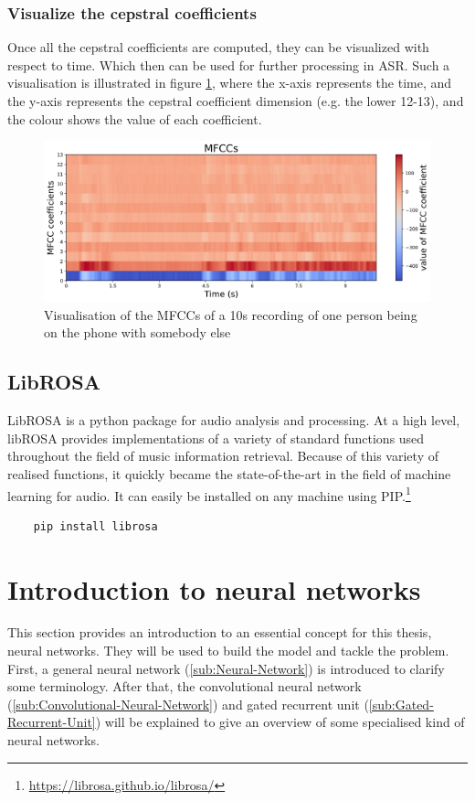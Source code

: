 \subsubsection{Visualize the cepstral coefficients}
Once all the cepstral coefficients are computed, they can be visualized with respect to time. Which then can be used for further processing in \gls{ASR}. Such a visualisation is illustrated in figure \ref{fig:MFCC-Visualisation}, where the x-axis represents the time, and the y-axis represents the cepstral coefficient dimension (e.g. the lower 12-13), and the colour shows the value of each coefficient.
\begin{figure}[htbp]
	\centering
	\includegraphics[scale=0.5]{img/mfccs.png}
	\caption{Visualisation of the MFCCs of a 10s recording of one person being on the phone with somebody else}
	\label{fig:MFCC-Visualisation}
\end{figure}

\subsection{LibROSA}
\label{sub:Librosa}
LibROSA is a python package for audio analysis and processing. At a high level, libROSA provides implementations of a variety of standard functions used throughout the ﬁeld of music information retrieval. Because of this variety of realised functions, it quickly became the state-of-the-art in the field of machine learning for audio. It can easily be installed on any machine using PIP.\footnote{\url{https://librosa.github.io/librosa/}}

\begin{verbatim}
    pip install librosa
\end{verbatim}

\section{Introduction to neural networks}
\label{sec:Intro-NN}
This section provides an introduction to an essential concept for this thesis, neural networks. They will be used to build the model and tackle the problem. First, a general neural network (\ref{sub:Neural-Network}) is introduced to clarify some terminology. After that, the convolutional neural network (\ref{sub:Convolutional-Neural-Network}) and gated recurrent unit (\ref{sub:Gated-Recurrent-Unit}) will be explained to give an overview of some specialised kind of neural networks.


